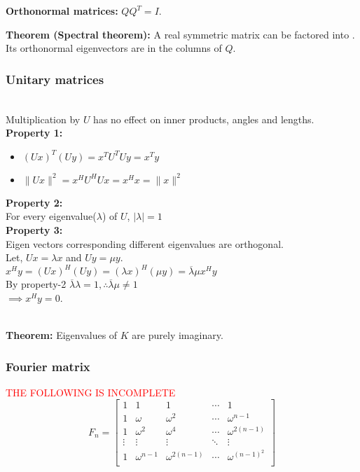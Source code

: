 \textbf{Orthonormal matrices:} $QQ^T = I$.

\textbf{Theorem (Spectral theorem):} A real symmetric matrix can be factored into . Its orthonormal eigenvectors are in the columns of $Q$.

\subsubsection{Unitary matrices}

\\
Multiplication by $U$ has no effect on inner products, angles and lengths.\\
\textbf{Property 1:}\\
\begin{itemize}
\item $(Ux)^T(Uy) = x^TU^TUy = x^Ty$\\
\item $\|Ux\|^2 = x^HU^HUx = x^Hx = \|x\|^2$
\end{itemize}
\textbf{Property 2:}\\
For every eigenvalue($\lambda$) of $U$, $|\lambda| = 1$\\

\textbf{Property 3:}\\
Eigen vectors corresponding different eigenvalues are orthogonal.\\
Let, $Ux = \lambda x$ and $Uy = \mu y$.\\
$x^Hy = (Ux)^H(Uy) = (\lambda x)^H(\mu y) = \overline{\lambda}\mu x^Hy$\\
By property-2 $\overline{\lambda}\lambda = 1, \therefore \overline{\lambda}\mu \neq 1$\\
$\implies x^Hy = 0$.

\vspace{6pt}

\\

\textbf{Theorem:} Eigenvalues of $K$ are purely imaginary.\\

\subsubsection{Fourier matrix}
\textcolor{red}{THE FOLLOWING IS INCOMPLETE}\\


$$F_n =
\begin{bmatrix}
1 & 1 & 1 & \cdots & 1\\
1 & \omega & \omega^2 & \cdots & \omega^{n-1}\\
1 & \omega^2 & \omega^4 & \cdots & \omega^{2(n-1)}\\
\vdots & \vdots & \vdots & \ddots & \vdots \\
1 & \omega^{n-1} & \omega^{2(n-1)} & \cdots & \omega^{(n-1)^2}\\
\end{bmatrix}
$$


